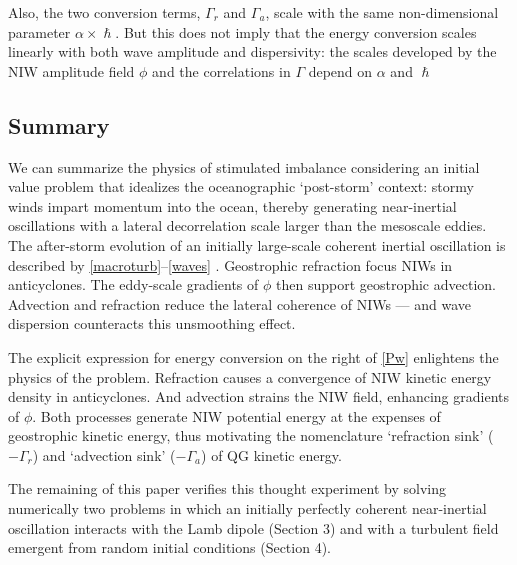 \documentclass{jfm}
\begin{document}
Also, the two conversion terms, $\Gamma_r$ and $\Gamma_a$,
scale with the same non-dimensional parameter $\alpha\times \hslash$. But this
does not imply that the energy conversion scales linearly with both wave amplitude
and dispersivity: the scales developed by the NIW amplitude field $\phi$ and the
 correlations in $\Gamma$ depend on $\alpha$ and $\hslash$


\subsection{Summary}
We can summarize the physics of stimulated imbalance considering an initial value
problem that idealizes the oceanographic `post-storm' context: stormy winds impart momentum
into the ocean, thereby generating near-inertial oscillations with a lateral
decorrelation scale larger than the mesoscale eddies. The after-storm evolution
of an initially large-scale coherent inertial oscillation is described by
\eqref{macroturb}--\eqref{waves} \citep{xie_vanneste2015}. Geostrophic refraction
focus NIWs in anticyclones. The eddy-scale gradients of $\phi$ then support
geostrophic advection. Advection and refraction reduce the lateral coherence
of NIWs --- and wave dispersion counteracts this unsmoothing effect.

The explicit expression for energy
conversion on the right of \eqref{Pw} enlightens the physics of  the problem.
Refraction causes a convergence of NIW kinetic energy density in anticyclones.
And advection strains the NIW field, enhancing gradients of $\phi$. Both
processes generate NIW potential energy at the expenses of geostrophic kinetic
energy, thus motivating the nomenclature `refraction sink' ($-\Gamma_r$) and
`advection sink' ($-\Gamma_a$)  of QG kinetic energy.

The remaining of this paper verifies this thought experiment by solving
numerically two problems in which an initially perfectly coherent near-inertial
oscillation interacts with the Lamb dipole (Section 3) and with a turbulent
field emergent from random initial conditions (Section 4).
\end{document}
